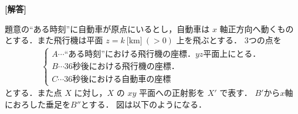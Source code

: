 \documentclass[../../main.tex]{subfiles}
\begin{document}
\begin{oframed}
  
\end{oframed}

{\bf [解答]}

題意の“ある時刻”に自動車が原点にいるとし，自動車は $x$ 軸正方向へ動くものとする．また飛行機は平面 $z=k\ \text{[km]}\ (>0)$ 上を飛ぶとする．
$3$つの点を
\begin{align}
  \begin{cases}
    A \cdots \text{“ある時刻”における飛行機の座標．} yz \text{平面上にとる．} \\
    B \cdots 36 \text{秒後における飛行機の座標．}  \\
    C \cdots 36 \text{秒後における自動車の座標}
  \end{cases}
\end{align}
とする．また点 $X$ に対し，$X$ の $xy$ 平面への正射影を $X'$ で表す．
$B'$から$x$軸におろした垂足を$B''$とする．
図は以下のようになる．
\end{document}
